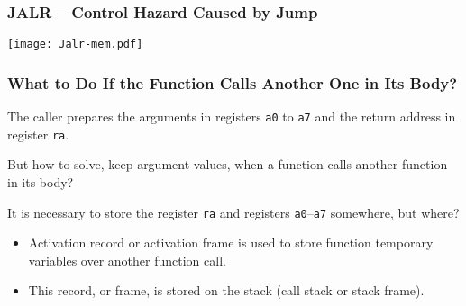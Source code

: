 \documentclass{beamer}
\begin{document}
\begin{frame}
\frametitle{JALR -- Control Hazard Caused by Jump}

\begin{center}
\texttt{[image: Jalr-mem.pdf]}
\end{center}

\end{frame}



\begin{frame}
\frametitle{What to Do If the Function Calls Another One in Its Body?}

The caller prepares the arguments in registers \texttt{a0} to \texttt{a7} and the return address in register \texttt{ra}.

\bigskip

But how to solve, keep argument values, when a function calls another function in its body?

\bigskip

It is necessary to store the register \texttt{ra} and registers \texttt{a0}--\texttt{a7} somewhere, but where?

\begin{itemize}
\item Activation record or activation frame is used to store function temporary variables over another function call.
\item This record, or frame, is stored on the stack (call stack or stack frame).
\end{itemize}
\end{frame}
\end{document}
